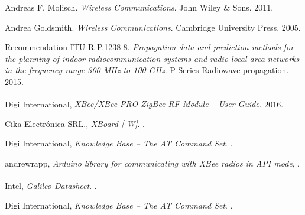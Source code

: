 \documentclass[11pt,oneside,spanish,a4paper]{article}
\begin{document}
\begin{thebibliography}{1}

 Andreas F. Molisch.
\emph{Wireless Communications}.
John Wiley \& Sons. 2011.

 Andrea Goldsmith.
\emph{Wireless Communications}.
Cambridge University Press. 2005.

 Recommendation ITU-R P.1238-8.
\emph{Propagation data and prediction methods
for the planning of indoor
radiocommunication systems and
radio local area networks in the
frequency range 300 MHz to 100 GHz}.
P Series Radiowave propagation. 2015.

  Digi International,
  \emph{XBee\textsuperscript{\textregistered{}}/XBee-PRO
    ZigBee\textsuperscript{\textregistered{}} RF Module -- User
    Guide}. 2016.
  
  Cika Electrónica SRL.,
  \emph{XBoard [-W]}.
  .

  Digi International,
  \emph{Knowledge Base -- The AT Command Set}.
  .

  andrewrapp,
\emph{Arduino library for communicating with XBee radios in API mode},
.

  Intel\textsuperscript{\textregistered{}},
  \emph{Galileo Datasheet}.
  .

Digi International,
\emph{Knowledge Base -- The AT Command Set}.
.
\end{thebibliography}
\end{document}
